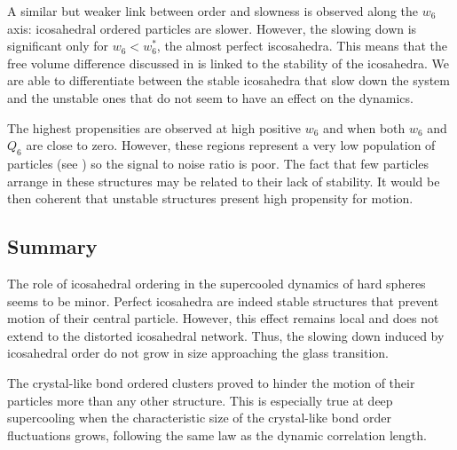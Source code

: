 A similar but weaker link between order and slowness is observed along the $w_6$ axis: icosahedral ordered particles are slower. However, the slowing down is significant only for $w_6<w_6^*$,  the almost perfect iscosahedra. This means that the free volume difference discussed in  is linked to the stability of the icosahedra. We are able to differentiate between the stable icosahedra that slow down the system and the unstable ones that do not seem to have an effect on the dynamics.

The highest propensities are observed at high positive $w_6$ and when both $w_6$ and $Q_6$ are close to zero. However, these regions represent a very low population of particles (see ) so the signal to noise ratio is poor. The fact that few particles arrange in these structures may be related to their lack of stability. It would be then coherent that unstable structures present high propensity for motion.

\subsection{Summary}

The role of icosahedral ordering in the supercooled dynamics of hard spheres seems to be minor. Perfect icosahedra are indeed stable structures that prevent motion of their central particle. However, this effect remains local and does not extend to the distorted icosahedral network. Thus, the slowing down induced by icosahedral order do not grow in size approaching the glass transition.

The crystal-like bond ordered clusters proved to hinder the motion of their particles more than any other structure. This is especially true at deep supercooling when the characteristic size of the crystal-like bond order fluctuations grows, following the same law as the dynamic correlation length.
